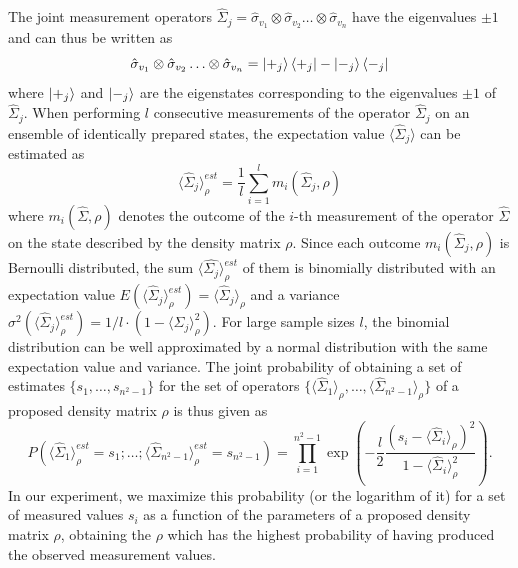 \smallskip

The joint measurement operators $\hat{\Sigma}_j = \hat{\sigma}_{v_1}\otimes \hat{\sigma}_{v_2}\hdots \otimes\hat{\sigma}_{v_n}$ have the eigenvalues $\pm 1$ and can thus be written as 
\begin{equation}
\hat{\sigma}_{v_1}\otimes \hat{\sigma}_{v_2}\hdots \otimes\hat{\sigma}_{v_n} = \left| +_j \right>\left< +_j \right|-\left| -_j \right>\left< -_j \right| \label{eq:ml_operators}
\end{equation}
where $\left| +_j \right>$ and $\left| -_j \right>$ are the eigenstates corresponding to the eigenvalues $\pm 1$ of $\hat{\Sigma}_j$. When performing $l$ consecutive measurements of the operator $\hat{\Sigma}_j$ on an ensemble of identically prepared states, the expectation value $\langle \hat{\Sigma}_j \rangle$ can be estimated as
%
\begin{equation}
\langle \hat{\Sigma}_j \rangle_\rho^{est}= \frac{1}{l}\sum\limits_{i = 1}^l m_i(\hat{\Sigma}_j,\rho) \label{eq:tomography_measurement_estimator}
\end{equation}
where $m_i(\hat{\Sigma},\rho)$ denotes the outcome of the $i$-th measurement of the operator $\hat{\Sigma}$ on the state described by the density matrix $\rho$. Since each outcome $m_i(\hat{\Sigma}_j,\rho)$ is Bernoulli distributed, the sum $\langle\hat{\Sigma_j}\rangle_\rho^{est}$ of them is binomially distributed with an expectation value \mbox{$E(\langle \hat{\Sigma}_j \rangle_\rho^{est}) = \langle \hat{\Sigma}_j \rangle_\rho$} and a variance $\sigma^2(\langle \hat{\Sigma}_j \rangle_\rho^{est}) = 1/l \cdot (1-\langle \hat{\Sigma}_j \rangle_\rho^2)$. For large sample sizes $l$, the binomial distribution can be well approximated by a normal distribution with the same expectation value and variance. The joint probability of obtaining a set of estimates $\{s_1,\hdots,s_{n^2-1}\}$ for the set of operators $\{\langle\hat{\Sigma}_1 \rangle_\rho,\hdots,\langle\hat{\Sigma}_{n^2-1} \rangle_\rho\}$ of a proposed density matrix $\rho$ is thus given as
%
\begin{equation}
P\left(\langle \hat{\Sigma}_1 \rangle_\rho^{est} = s_1;\hdots;\langle \hat{\Sigma}_{n^2-1} \rangle_\rho^{est} =  s_{n^2-1}\right) = \prod\limits_{i = 1}^{n^2-1} \exp{\left(-\frac{l}{2}\frac{(s_i-\langle \hat{\Sigma}_i \rangle_\rho)^2}{1-\langle \hat{\Sigma}_i \rangle_\rho^2}\right)}.
\end{equation}
%
In our experiment, we maximize this probability (or the logarithm of it) for a set of measured values $s_i$ as a function of the parameters of a proposed density matrix $\rho$, obtaining the $\rho$ which has the highest probability of having produced the observed measurement values.

